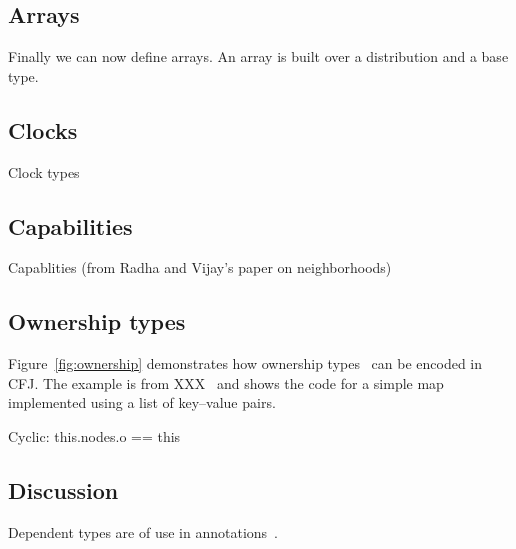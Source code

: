\subsection{Arrays}

\cite{gps06-arrays}

Finally we can now define arrays. An array is built over a
distribution and a base type.

%

\subsection{Clocks}

Clock types

\subsection{Capabilities}

Capablities (from Radha and Vijay's paper on neighborhoods)

\subsection{Ownership types}

Figure~\ref{fig:ownership} demonstrates how ownership
types~\cite{ownership-types} can be encoded in CFJ.
The example is from XXX~\cite{???} and shows the code for a
simple map implemented using a list of key--value pairs.

Cyclic: this.nodes.o == this

\begin{figure*}

\caption{Ownership types}
\label{fig:ownership}
\end{figure*}

\subsection{Discussion}

Dependent types are of use in annotations~\cite{ns07-x10anno}.
